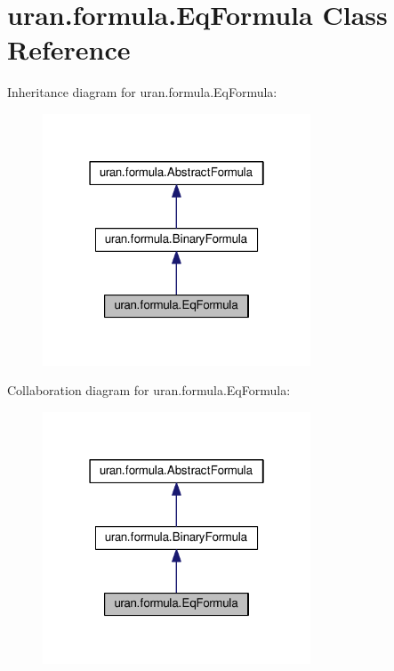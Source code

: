 \hypertarget{classuran_1_1formula_1_1_eq_formula}{}\section{uran.\+formula.\+Eq\+Formula Class Reference}
\label{classuran_1_1formula_1_1_eq_formula}


Inheritance diagram for uran.\+formula.\+Eq\+Formula\+:
\nopagebreak
\begin{figure}[H]
\begin{center}
\leavevmode
\includegraphics[width=226pt]{classuran_1_1formula_1_1_eq_formula__inherit__graph}
\end{center}
\end{figure}


Collaboration diagram for uran.\+formula.\+Eq\+Formula\+:
\nopagebreak
\begin{figure}[H]
\begin{center}
\leavevmode
\includegraphics[width=226pt]{classuran_1_1formula_1_1_eq_formula__coll__graph}
\end{center}
\end{figure}
